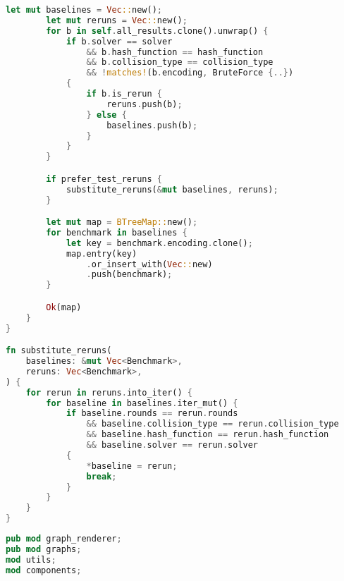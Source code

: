 \begin{lstlisting}[language=rust, caption={data/data\_retriever.rs}]
		let mut baselines = Vec::new();
		let mut reruns = Vec::new();
		for b in self.all_results.clone().unwrap() {
			if b.solver == solver
				&& b.hash_function == hash_function
				&& b.collision_type == collision_type
				&& !matches!(b.encoding, BruteForce {..})
			{
				if b.is_rerun {
					reruns.push(b);
				} else {
					baselines.push(b);
				}
			}
		}

		if prefer_test_reruns {
			substitute_reruns(&mut baselines, reruns);
		}

		let mut map = BTreeMap::new();
		for benchmark in baselines {
			let key = benchmark.encoding.clone();
			map.entry(key)
				.or_insert_with(Vec::new)
				.push(benchmark);
		}

		Ok(map)
	}
}

fn substitute_reruns(
	baselines: &mut Vec<Benchmark>,
	reruns: Vec<Benchmark>,
) {
	for rerun in reruns.into_iter() {
		for baseline in baselines.iter_mut() {
			if baseline.rounds == rerun.rounds
				&& baseline.collision_type == rerun.collision_type
				&& baseline.hash_function == rerun.hash_function
				&& baseline.solver == rerun.solver
			{
				*baseline = rerun;
				break;
			}
		}
	}
}
\end{lstlisting}

\begin{lstlisting}[language=rust, caption={graphing/mod.rs}]
pub mod graph_renderer;
pub mod graphs;
mod utils;
mod components;
\end{lstlisting}

